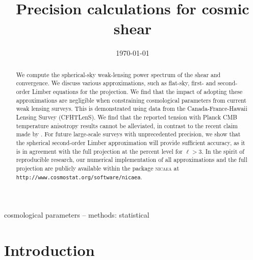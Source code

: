 \documentclass[fleqn,usenatbib]{mnras} %
\title[Precision calculations for cosmic shear]{Precision calculations for cosmic shear}  %
\date{\today}
\begin{document}
\setlength{\voffset}{-12mm}

\label{firstpage}


\maketitle
\begin{abstract}

We compute the spherical-sky weak-lensing power spectrum of the shear and
convergence. We discuss various approximations, such as flat-sky, first- and
second-order Limber equations for the projection. We find that the impact of adopting 
these approximations are negligible when constraining cosmological parameters from 
current weak lensing surveys.
This is demonstrated using data from the Canada-France-Hawaii Lensing Survey (CFHTLenS). 
We find that the reported tension with Planck CMB temperature anisotropy results cannot be alleviated, in
contrast to the recent claim made by \citet{2016arXiv161104954K}. 
For future large-scale surveys with unprecedented precision, we show that the spherical
second-order Limber approximation will provide sufficient accuracy, as it is in 
agreement with the full projection at the percent level for $\ell > 3$.  
In the spirit of reproducible research, our numerical implementation of all approximations
and the full projection are publicly available within the package
\textsc{nicaea} at \texttt{http://www.cosmostat.org/software/nicaea}.

\end{abstract}

\begin{keywords}
cosmological parameters -- methods: statistical
\end{keywords}



\section{Introduction}
\label{sec:intro}
\end{document}
